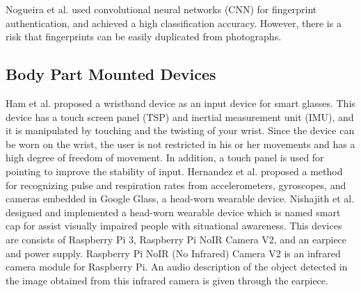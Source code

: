 \documentclass[sigchi,authordraft]{acmart}
\begin{document}

Nogueira et al.\cite{finger_CNN} used convolutional neural networks (CNN) for fingerprint authentication, and achieved a high classification accuracy. However, there is a risk that fingerprints can be easily duplicated from photographs.


\subsection{Body Part Mounted Devices}
Ham et al.\cite{smart_wristband} proposed a wristband device as an input device for smart glasses. This device has a touch screen panel (TSP) and inertial measurement unit (IMU), and it is manipulated by touching and the twisting of your wrist. Since the device can be worn on the wrist, the user is not restricted in his or her movements and has a high degree of freedom of movement. In addition, a touch panel is used for pointing to improve the stability of input. Hernandez et al.\cite{bioglass} proposed a method for recognizing pulse and respiration rates from accelerometers, gyroscopes, and cameras embedded in Google Glass, a head-worn wearable device. Nishajith et al.\cite{smart_cap} designed and implemented a head-worn wearable device which is named smart cap for assist visually impaired people with situational awareness. This devices are consists of Raspberry Pi 3, Raspberry Pi NoIR Camera V2, and an earpiece and power supply. Raspberry Pi NoIR (No Infrared)  Camera V2 is an infrared camera module for Raspberry Pi. An audio description of the object detected in the image obtained from this infrared camera is given through the earpiece.\par
\end{document}
